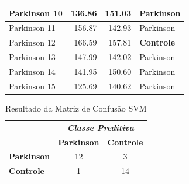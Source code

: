 \begin{table}[!h]
\begin{tabular}{|l|l|l|l|}
Parkinson 10         & \multicolumn{1}{r|}{136.86}                                                          & \multicolumn{1}{r|}{151.03}                                                          & Parkinson                                                            \\ \hline
Parkinson 11         & \multicolumn{1}{r|}{156.87}                                                          & \multicolumn{1}{r|}{142.93}                                                          & Parkinson                                                            \\ \hline
Parkinson 12         & \multicolumn{1}{r|}{166.59}                                                          & \multicolumn{1}{r|}{157.81}                                                          & \textbf{Controle}                                                            \\ \hline
Parkinson 13         & \multicolumn{1}{r|}{147.99}                                                          & \multicolumn{1}{r|}{142.02}                                                          & Parkinson                                                            \\ \hline
Parkinson 14         & \multicolumn{1}{r|}{141.95}                                                          & \multicolumn{1}{r|}{150.60}                                                          & Parkinson                                                            \\ \hline
Parkinson 15         & \multicolumn{1}{r|}{125.69}                                                          & \multicolumn{1}{r|}{140.62}                                                          & Parkinson                                                            
\\ \hline
\end{tabular}
\end{table}


\begin{table}[!htbp]
\caption{Resultado da Matriz de Confusão SVM}
\label{table:resultadomatrizconfusaosvm}
\centering
\begin{tabular}{l|c|c|}
\cline{2-3}
\multicolumn{1}{c}{}                         & \multicolumn{2}{|c|}{\textit{\textbf{Classe Preditiva}}} \\ \cline{2-3} 
                                             & \textbf{Parkinson}      & \textbf{Controle}         \\ \hline
\multicolumn{1}{|l|}{\textbf{Parkinson}} & 12       & 3           \\ \hline
\multicolumn{1}{|l|}{\textbf{Controle}}     & 1           & 14     \\ \hline
\end{tabular}

\end{table}


